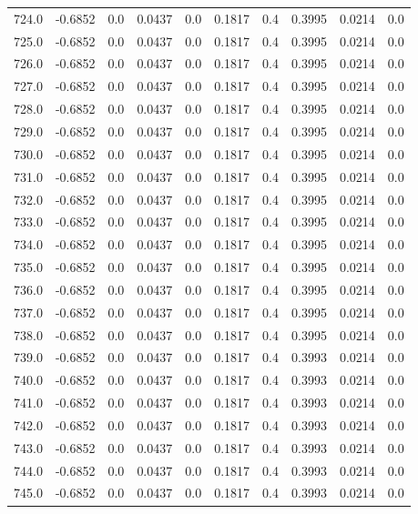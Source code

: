\begin{longtable}{lrrrrrrrrr}
724.0 & -0.6852 & 0.0 & 0.0437 & 0.0 & 0.1817 & 0.4 & 0.3995 & 0.0214 & 0.0 \\
725.0 & -0.6852 & 0.0 & 0.0437 & 0.0 & 0.1817 & 0.4 & 0.3995 & 0.0214 & 0.0 \\
726.0 & -0.6852 & 0.0 & 0.0437 & 0.0 & 0.1817 & 0.4 & 0.3995 & 0.0214 & 0.0 \\
727.0 & -0.6852 & 0.0 & 0.0437 & 0.0 & 0.1817 & 0.4 & 0.3995 & 0.0214 & 0.0 \\
728.0 & -0.6852 & 0.0 & 0.0437 & 0.0 & 0.1817 & 0.4 & 0.3995 & 0.0214 & 0.0 \\
729.0 & -0.6852 & 0.0 & 0.0437 & 0.0 & 0.1817 & 0.4 & 0.3995 & 0.0214 & 0.0 \\
730.0 & -0.6852 & 0.0 & 0.0437 & 0.0 & 0.1817 & 0.4 & 0.3995 & 0.0214 & 0.0 \\
731.0 & -0.6852 & 0.0 & 0.0437 & 0.0 & 0.1817 & 0.4 & 0.3995 & 0.0214 & 0.0 \\
732.0 & -0.6852 & 0.0 & 0.0437 & 0.0 & 0.1817 & 0.4 & 0.3995 & 0.0214 & 0.0 \\
733.0 & -0.6852 & 0.0 & 0.0437 & 0.0 & 0.1817 & 0.4 & 0.3995 & 0.0214 & 0.0 \\
734.0 & -0.6852 & 0.0 & 0.0437 & 0.0 & 0.1817 & 0.4 & 0.3995 & 0.0214 & 0.0 \\
735.0 & -0.6852 & 0.0 & 0.0437 & 0.0 & 0.1817 & 0.4 & 0.3995 & 0.0214 & 0.0 \\
736.0 & -0.6852 & 0.0 & 0.0437 & 0.0 & 0.1817 & 0.4 & 0.3995 & 0.0214 & 0.0 \\
737.0 & -0.6852 & 0.0 & 0.0437 & 0.0 & 0.1817 & 0.4 & 0.3995 & 0.0214 & 0.0 \\
738.0 & -0.6852 & 0.0 & 0.0437 & 0.0 & 0.1817 & 0.4 & 0.3995 & 0.0214 & 0.0 \\
739.0 & -0.6852 & 0.0 & 0.0437 & 0.0 & 0.1817 & 0.4 & 0.3993 & 0.0214 & 0.0 \\
740.0 & -0.6852 & 0.0 & 0.0437 & 0.0 & 0.1817 & 0.4 & 0.3993 & 0.0214 & 0.0 \\
741.0 & -0.6852 & 0.0 & 0.0437 & 0.0 & 0.1817 & 0.4 & 0.3993 & 0.0214 & 0.0 \\
742.0 & -0.6852 & 0.0 & 0.0437 & 0.0 & 0.1817 & 0.4 & 0.3993 & 0.0214 & 0.0 \\
743.0 & -0.6852 & 0.0 & 0.0437 & 0.0 & 0.1817 & 0.4 & 0.3993 & 0.0214 & 0.0 \\
744.0 & -0.6852 & 0.0 & 0.0437 & 0.0 & 0.1817 & 0.4 & 0.3993 & 0.0214 & 0.0 \\
745.0 & -0.6852 & 0.0 & 0.0437 & 0.0 & 0.1817 & 0.4 & 0.3993 & 0.0214 & 0.0 \\

\end{longtable}
